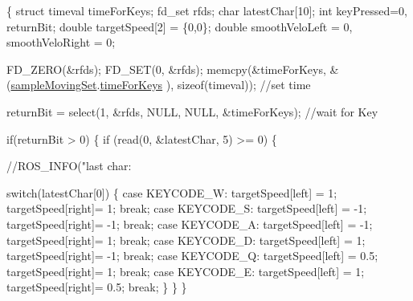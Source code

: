\begin{DoxyCode}
\{
    \textcolor{keyword}{struct }timeval timeForKeys;
    fd\_set rfds;
    \textcolor{keywordtype}{char} latestChar[10];
    \textcolor{keywordtype}{int} keyPressed=0, returnBit;
    \textcolor{keywordtype}{double} targetSpeed[2] = \{0,0\};
    \textcolor{keywordtype}{double} smoothVeloLeft = 0, smoothVeloRight = 0;

    FD\_ZERO(&rfds);
    FD\_SET(0, &rfds);
    memcpy(&timeForKeys, &(\hyperlink{classSampleMoving_af9c7dc0be1c4197469fbfa7aa105f1cc}{sampleMovingSet}.\hyperlink{structSampleMoving_1_1sampleMovingSettingStruct_a4d960897101facc5a4d0e0998d68728e}{timeForKeys}
      ), \textcolor{keyword}{sizeof}(timeval)); \textcolor{comment}{//set time}

    returnBit = select(1, &rfds, NULL, NULL, &timeForKeys); \textcolor{comment}{//wait for Key}

    \textcolor{keywordflow}{if}(returnBit > 0)
    \{
        \textcolor{keywordflow}{if} (read(0, &latestChar, 5) >= 0) \{
            \textcolor{comment}{//ROS\_INFO("last char: %

            \textcolor{keywordflow}{switch}(latestChar[0]) \{
            \textcolor{keywordflow}{case} KEYCODE\_W: targetSpeed[left] = 1;
                            targetSpeed[right]= 1;
                            \textcolor{keywordflow}{break};
            \textcolor{keywordflow}{case} KEYCODE\_S: targetSpeed[left] = -1;
                            targetSpeed[right]= -1;
                            \textcolor{keywordflow}{break};
            \textcolor{keywordflow}{case} KEYCODE\_A: targetSpeed[left] = -1;
                            targetSpeed[right]= 1;
                            \textcolor{keywordflow}{break};
            \textcolor{keywordflow}{case} KEYCODE\_D: targetSpeed[left] = 1;
                            targetSpeed[right]= -1;
                            \textcolor{keywordflow}{break};
            \textcolor{keywordflow}{case} KEYCODE\_Q: targetSpeed[left] = 0.5;
                            targetSpeed[right]= 1;
                            \textcolor{keywordflow}{break};
            \textcolor{keywordflow}{case} KEYCODE\_E: targetSpeed[left] = 1;
                            targetSpeed[right]= 0.5;
                            \textcolor{keywordflow}{break};
            \}
        \}
    \}

}
\end{DoxyCode}
